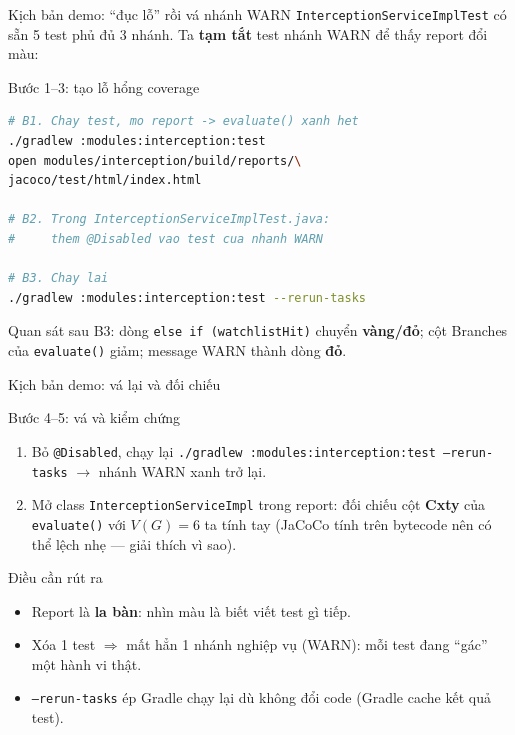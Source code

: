 \documentclass[aspectratio=169,12pt]{beamer}
\begin{document}
\begin{frame}[fragile]{Kịch bản demo: ``đục lỗ'' rồi vá nhánh WARN}
  \texttt{InterceptionServiceImplTest} có sẵn 5 test phủ đủ 3 nhánh.
  Ta \textbf{tạm tắt} test nhánh WARN để thấy report đổi màu:

  \vspace{0.2em}
  \begin{block}{Bước 1--3: tạo lỗ hổng coverage}
\begin{lstlisting}[language=bash,basicstyle=\ttfamily\footnotesize]
# B1. Chay test, mo report -> evaluate() xanh het
./gradlew :modules:interception:test
open modules/interception/build/reports/\
jacoco/test/html/index.html

# B2. Trong InterceptionServiceImplTest.java:
#     them @Disabled vao test cua nhanh WARN

# B3. Chay lai
./gradlew :modules:interception:test --rerun-tasks
\end{lstlisting}
  \end{block}

  Quan sát sau B3: dòng \texttt{else if (watchlistHit)} chuyển
  \textbf{vàng/đỏ}; cột Branches của \texttt{evaluate()} giảm;
  message WARN thành dòng \textbf{đỏ}.
\end{frame}

\begin{frame}{Kịch bản demo: vá lại và đối chiếu}
  \begin{block}{Bước 4--5: vá và kiểm chứng}
    \begin{enumerate}
      \item[B4.] Bỏ \texttt{@Disabled}, chạy lại
            \texttt{./gradlew :modules:interception:test --rerun-tasks}
            $\to$ nhánh WARN xanh trở lại.
      \item[B5.] Mở class \texttt{InterceptionServiceImpl} trong report:
            đối chiếu cột \textbf{Cxty} của \texttt{evaluate()} với
            $V(G) = 6$ ta tính tay (JaCoCo tính trên bytecode nên có thể
            lệch nhẹ --- giải thích vì sao).
    \end{enumerate}
  \end{block}

  \vspace{0em}
  \begin{exampleblock}{Điều cần rút ra}
    \begin{itemize}
      \item Report là \textbf{la bàn}: nhìn màu là biết viết test gì tiếp.
      \item Xóa 1 test $\Rightarrow$ mất hẳn 1 nhánh nghiệp vụ (WARN):
            mỗi test đang ``gác'' một hành vi thật.
      \item \texttt{--rerun-tasks} ép Gradle chạy lại dù không đổi code
            (Gradle cache kết quả test).
    \end{itemize}
  \end{exampleblock}
\end{frame}
\end{document}
